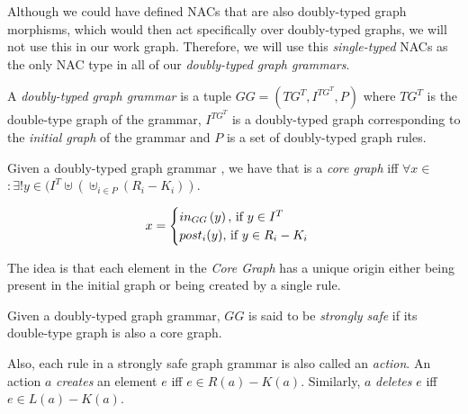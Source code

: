 \begin{example} 
\end{example}

\begin{remark}
  Although we could have defined NACs that are also doubly-typed graph morphisms, which would then act specifically over doubly-typed graphs, we will not use this in our work graph. Therefore, we will use this \emph{single-typed} NACs as the only NAC type in all of our \emph{doubly-typed graph grammars}.
\end{remark}

\begin{definition} A \emph{doubly-typed graph grammar} is a tuple $GG = \left(TG^T, I^{TG^T},P \right)$ where $TG^T$ is the double-type graph of the grammar, $I^{TG^T}$ is a doubly-typed graph corresponding to the \emph{initial graph} of the grammar and $P$ is a set of doubly-typed graph rules. 
\end{definition}

\begin{example}
\end{example}

\begin{definition} Given a doubly-typed graph grammar \doublyTypedGraphGrammarCore{}, we have that \coreGraph{} is a \emph{core graph} iff \mbox{$\forall x \in$ \coreGraph $: \exists! y \in (I^T \uplus (\uplus_{i \in P} (R_i - K_i))$}.


\[ x =
    \begin{cases}
      in_{GG}\parens{y},$ if $y \in I^T\\
      post_i(y),$ if $y \in R_i - K_i\\
    \end{cases}
   \]

  \begin{intuition} The idea is that each element in the \emph{Core Graph} has a unique origin either being present in the initial graph or being created by a single rule.
\end{intuition}


\end{definition}

\begin{example}
\end{example}

\begin{definition} Given \doublyTypedGraphGrammarCore{} a doubly-typed graph grammar, $GG$ is said to be \emph{strongly safe} if its double-type graph is also a core graph.

Also, each rule in a strongly safe graph grammar is also called an \emph{action}. An action $a$ \emph{creates} an element $e$ iff $e \in R(a) - K(a)$. Similarly, $a$ \emph{deletes} $e$ iff $e \in L(a) - K(a)$.
\end{definition}

